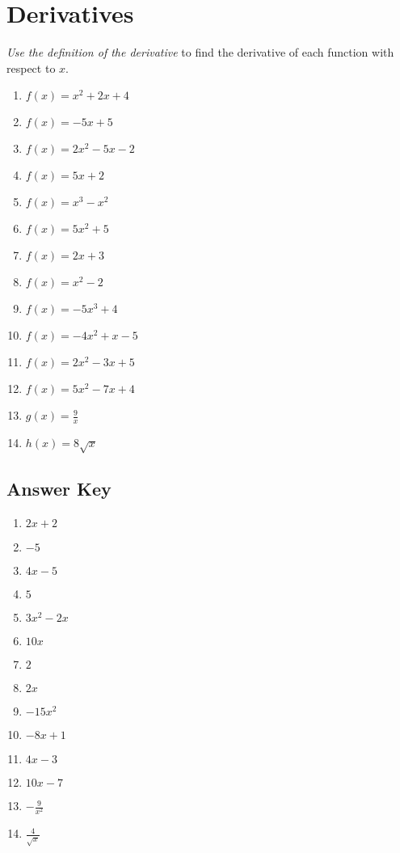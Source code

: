 \chapter{Derivatives}

\emph{Use the definition of the derivative} to find the derivative of each function with respect to $x$.

\begin{enumerate}
	\item $f(x) = x^2 + 2x + 4$
	\item $f(x) = -5x + 5$
	\item $f(x) = 2x^2 - 5x - 2$
	\item $f(x) = 5x+2$
	\item $f(x) = x^3 - x^2$
	\item $f(x) = 5x^2 + 5$
	\item $f(x) = 2x + 3$
	\item $f(x) = x^2 - 2$
	\item $f(x) = -5x^3 + 4$
	\item $f(x) = -4x^2 + x - 5$
	\item $f(x) = 2x^2 - 3x + 5$
	\item $f(x) = 5x^2 - 7x + 4$
	\item $g(x) = \frac{9}{x}$
	\item $h(x) = 8\sqrt{x}$
\end{enumerate}

\newpage

\section{Answer Key}

\begin{enumerate}
	\item $2x + 2$
	\item $-5$
	\item $4x - 5$
	\item $5$
	\item $3x^2 - 2x$
	\item $10x$
	\item $2$
	\item $2x$
	\item $-15x^2$
	\item $-8x + 1$
	\item $4x - 3$
	\item $10x-7$
    \item $-\frac{9}{x^2}$
    \item $\frac{4}{\sqrt{x}}$
\end{enumerate}